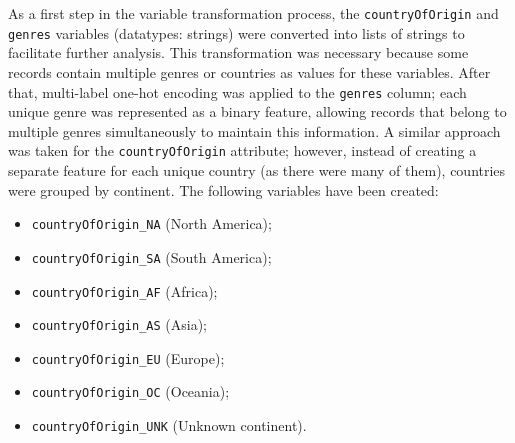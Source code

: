 As a first step in the variable transformation process, the \texttt{countryOfOrigin} and \texttt{genres} variables (datatypes: strings) were converted into 
lists of strings to facilitate further analysis. This transformation was necessary because some records contain multiple genres or countries as values for these variables.
After that, multi-label one-hot encoding was applied to the \texttt{genres} column; each unique genre was represented as a binary feature, 
allowing records that belong to multiple genres simultaneously to maintain this information.
A similar approach was taken for the \texttt{countryOfOrigin} attribute; however, instead of creating a separate feature for each unique country 
(as there were many of them), countries were grouped by continent.
The following variables have been created: 
\begin{multicols}{2}
\begin{itemize}
    \item \texttt{countryOfOrigin\_NA} (North America);
    \item \texttt{countryOfOrigin\_SA} (South America);
    \item \texttt{countryOfOrigin\_AF} (Africa);
    \item \texttt{countryOfOrigin\_AS} (Asia);
    \item \texttt{countryOfOrigin\_EU} (Europe);
    \item \texttt{countryOfOrigin\_OC} (Oceania);
    \item \texttt{countryOfOrigin\_UNK} (Unknown continent).
\end{itemize}
\end{multicols}
